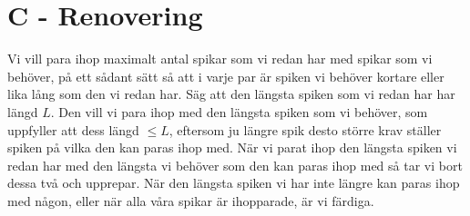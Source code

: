 \section*{C - Renovering}
Vi vill para ihop maximalt antal spikar som vi redan har med spikar som vi behöver,
på ett sådant sätt så att i varje par är spiken vi behöver kortare eller lika lång som den vi redan har.
Säg att den längsta spiken som vi redan har har längd $L$.
Den vill vi para ihop med den längsta spiken som vi behöver, som uppfyller att dess längd $\leq L$,
eftersom ju längre spik desto större krav ställer spiken på vilka den kan paras ihop med.
När vi parat ihop den längsta spiken vi redan har med den längsta vi behöver som den kan paras ihop med så tar vi bort dessa två och upprepar.
När den längsta spiken vi har inte längre kan paras ihop med någon, eller när alla våra spikar är ihopparade, är vi färdiga.

